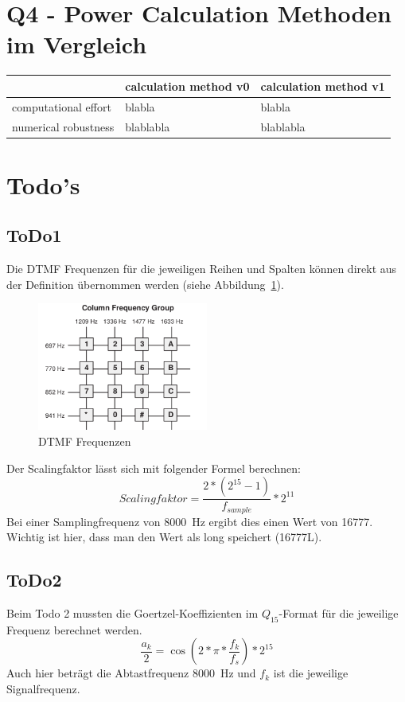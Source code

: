 \documentclass[a4paper,11pt]{article}
\begin{document}
\section{Q4 - Power Calculation Methoden im Vergleich}
\begin{tabular}{lll}
\hline
   & calculation method v0 & calculation method v1 \\
\hline
computational effort    & blabla    & blabla  \\
numerical robustness & blablabla  & blablabla  \\
\hline
\end{tabular}

\section{Todo's}
\subsection{ToDo1}
Die DTMF Frequenzen für die jeweiligen Reihen und Spalten können direkt aus der Definition übernommen werden (siehe Abbildung~\ref{fig:DTMF_freq}).
\begin{figure}[h!]
\centering
\includegraphics[width=0.5\textwidth]{DTMF_freq}
\caption{DTMF Frequenzen}
\label{fig:DTMF_freq}
\end{figure}
\newline
Der Scalingfaktor lässt sich mit folgender Formel berechnen:
\begin{equation}\label{eq:Scalingfakt}
	Scalingfaktor = \frac{2*(2^{15}-1)}{f_{sample}}*2^{11}
\end{equation}
Bei einer Samplingfrequenz von \SI{8000}{\hertz} ergibt dies einen Wert von 16777. Wichtig ist hier, dass man den Wert als long speichert (16777L). 

\subsection{ToDo2}
Beim Todo 2 mussten die Goertzel-Koeffizienten im $Q_{15}$-Format für die jeweilige Frequenz berechnet werden.
\begin{equation}\label{eq:Goertzel_Koeff}
	\frac{a_k}{2}= \cos(2*\pi*\frac{f_k}{f_s})*2^{15}
\end{equation}
Auch hier beträgt die Abtastfrequenz \SI{8000}{\hertz} und $f_k$ ist die jeweilige Signalfrequenz.
\end{document}
